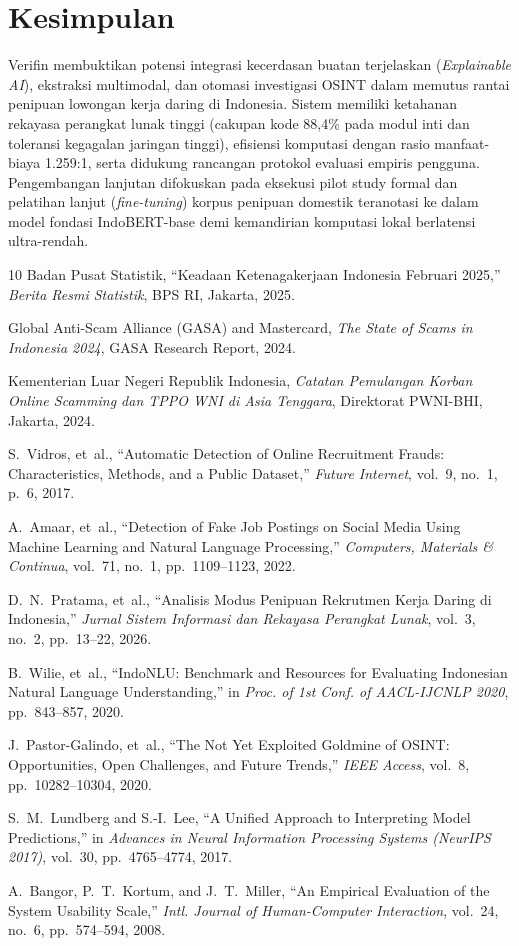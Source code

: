 \documentclass[conference]{IEEEtran}
\begin{document}
\section{Kesimpulan}
Verifin membuktikan potensi integrasi kecerdasan buatan terjelaskan (\textit{Explainable AI}), ekstraksi multimodal, dan otomasi investigasi OSINT dalam memutus rantai penipuan lowongan kerja daring di Indonesia. Sistem memiliki ketahanan rekayasa perangkat lunak tinggi (cakupan kode 88,4\% pada modul inti dan toleransi kegagalan jaringan tinggi), efisiensi komputasi dengan rasio manfaat-biaya 1.259:1, serta didukung rancangan protokol evaluasi empiris pengguna. Pengembangan lanjutan difokuskan pada eksekusi pilot study formal dan pelatihan lanjut (\textit{fine-tuning}) korpus penipuan domestik teranotasi ke dalam model fondasi IndoBERT-base demi kemandirian komputasi lokal berlatensi ultra-rendah.

\begin{thebibliography}{10}
Badan Pusat Statistik, ``Keadaan Ketenagakerjaan Indonesia Februari 2025,'' \textit{Berita Resmi Statistik}, BPS RI, Jakarta, 2025.

Global Anti-Scam Alliance (GASA) and Mastercard, \textit{The State of Scams in Indonesia 2024}, GASA Research Report, 2024.

Kementerian Luar Negeri Republik Indonesia, \textit{Catatan Pemulangan Korban Online Scamming dan TPPO WNI di Asia Tenggara}, Direktorat PWNI-BHI, Jakarta, 2024.

S.~Vidros, et~al., ``Automatic Detection of Online Recruitment Frauds: Characteristics, Methods, and a Public Dataset,'' \textit{Future Internet}, vol.~9, no.~1, p.~6, 2017.

A.~Amaar, et~al., ``Detection of Fake Job Postings on Social Media Using Machine Learning and Natural Language Processing,'' \textit{Computers, Materials \& Continua}, vol.~71, no.~1, pp.~1109--1123, 2022.

D.~N.~Pratama, et~al., ``Analisis Modus Penipuan Rekrutmen Kerja Daring di Indonesia,'' \textit{Jurnal Sistem Informasi dan Rekayasa Perangkat Lunak}, vol.~3, no.~2, pp.~13--22, 2026.

B.~Wilie, et~al., ``IndoNLU: Benchmark and Resources for Evaluating Indonesian Natural Language Understanding,'' in \textit{Proc. of 1st Conf. of AACL-IJCNLP 2020}, pp.~843--857, 2020.

J.~Pastor-Galindo, et~al., ``The Not Yet Exploited Goldmine of OSINT: Opportunities, Open Challenges, and Future Trends,'' \textit{IEEE Access}, vol.~8, pp.~10282--10304, 2020.

S.~M.~Lundberg and S.-I.~Lee, ``A Unified Approach to Interpreting Model Predictions,'' in \textit{Advances in Neural Information Processing Systems (NeurIPS 2017)}, vol.~30, pp.~4765--4774, 2017.

A.~Bangor, P.~T.~Kortum, and J.~T.~Miller, ``An Empirical Evaluation of the System Usability Scale,'' \textit{Intl. Journal of Human-Computer Interaction}, vol.~24, no.~6, pp.~574--594, 2008.
\end{thebibliography}
\end{document}
